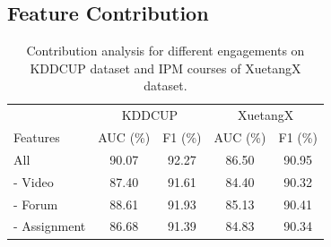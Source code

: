   
  \subsection{Feature Contribution}
  	\begin{table}
		\caption{Contribution analysis for different engagements on KDDCUP dataset and IPM courses of XuetangX dataset.}
		\centering
		\setlength{\tabcolsep}{1.2mm}\begin{tabular}{lcccc}
		\hline \hline
			              & \multicolumn{2}{c}{KDDCUP} & \multicolumn{2}{c}{XuetangX} \\
			{Features}                &AUC (\%)   & F1 (\%)  & AUC (\%)   & F1 (\%)  \\ \hline 
			{All}                     & 90.07 & 92.27 & 86.50 & 90.95     \\ \hline
	   	  - Video         &  87.40 & 91.61     &84.40	  &90.32 \\ 
	      - Forum         & 88.61 & 91.93    & 85.13  &  90.41 \\
		  - Assignment   & 86.68  & 91.39     & 84.83  & 90.34 \\
			 \hline \hline
 \end{tabular}

	  \label{tab:featImp}	
	\end{table}
	
